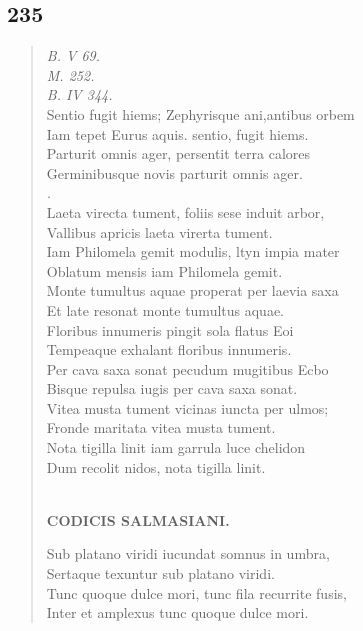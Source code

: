\documentclass[11pt, a4paper]{report}
\begin{document}
            \subsection*{235}
      \begin{verse}
      \textit{B. V 69.} \\ \textit{M. 252.} \\ \textit{B. IV 344.} \\ Sentio fugit hiems; Zephyrisque ani,antibus orbem \\ Iam tepet Eurus aquis. sentio, fugit hiems. \\ Parturit omnis ager, persentit terra calores \\ Germinibusque novis parturit omnis ager. \\ \textit{.} \\ Laeta virecta tument, foliis sese induit arbor, \\ Vallibus apricis laeta virerta tument. \\ Iam Philomela gemit modulis, ltyn impia mater \\ Oblatum mensis iam Philomela gemit. \\ Monte tumultus aquae properat per laevia saxa \\ Et late resonat monte tumultus aquae. \\ Floribus innumeris pingit sola flatus Eoi \\ Tempeaque exhalant floribus innumeris. \\ Per cava saxa sonat pecudum mugitibus Ecbo \\ Bisque repulsa iugis per cava saxa sonat. \\ Vitea musta tument vicinas iuncta per ulmos; \\ Fronde maritata vitea musta tument. \\ Nota tigilla linit iam garrula luce chelidon \\ Dum recolit nidos, nota tigilla linit. \\ 
        ﻿\pagebreak 
    \begin{center} \textbf{CODICIS SALMASIANI.} \end{center} \marginpar{[195]} Sub platano viridi iucundat somnus in umbra, \\ Sertaque texuntur sub platano viridi. \\ Tunc quoque dulce mori, tunc fila recurrite fusis, \\ Inter et amplexus tunc quoque dulce mori. \\ 
      \end{verse}
  
\end{document}

